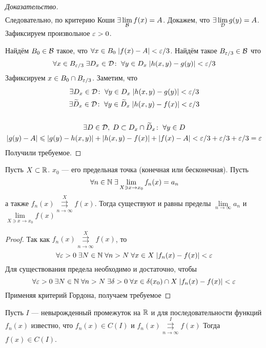 \documentclass[a4paper, 12pt]{article}
\begin{document}
\begin{proof}[Доказательство]
\begin{gather}
    \end{gather}
    Следовательно, по критерию Коши $\exists \lim\limits_{\mathcal{B}} f(x) = A$. Докажем, что $\exists \lim \limits_{\mathcal{D}} g(y) = A$. Зафиксируем произвольное $\varepsilon > 0$.
    \par Найдём  $B_0 \in \mathcal{B}$ такое, что $\forall x\in B_0\; |f(x) - A| < \varepsilon/3$. Найдём такое $B_{\varepsilon/3} \in \mathcal{B}$ что 
    $$
        \forall x\in B_{\varepsilon/3}\; \exists D_x\in \mathcal{D}\colon \; \forall y\in D_x\; |h(x,y) - g(y)| < \varepsilon/3 
    $$
    Зафиксируем $x\in B_0\cap B_{\varepsilon/3}$. Заметим, что 
    \begin{gather}
        \exists D_x \in \mathcal{D}\colon \; \forall y\in D_x \; |h(x,y) - g(y)| <\varepsilon/3\\
        \exists \widetilde{D}_x\in \mathcal{D}\colon \; \forall y\in \widetilde{D}_x\; |h(x,y) - f(x)| < \varepsilon/3\\
        \ \\
        \exists D\in \mathcal{D},\; D \subset D_x \cap \widetilde{D}_x\colon \; \forall y\in D\\
        |g(y) - A| \leqslant |g(y) - h(x,y)| + |h(x,y) - f(x)| + |f(x) - A| < \varepsilon/3 + \varepsilon/3 + \varepsilon/3 = \varepsilon
    \end{gather}
    Получили требуемое.
\end{proof}
\begin{Theorem}
    Пусть $X\subset \mathbb{R}$. $x_0$ --- его предельная точка (конечная или бесконечная). Пусть 
    $$
        \forall n \in \mathbb{N}\; \exists \lim\limits_{X\owns x \to x_0} f_n(x) = a_n
    $$
    а также $f_n(x)\overset{X}{\underset{n\to\infty}{\rightrightarrows}} f(x)$. Тогда  существуют и равны пределы $\lim\limits_{n \to \infty}a_n$ и $\lim\limits_{X \owns x\to x_0} f(x)$
\end{Theorem}
\begin{proof}
    Так как $f_n(x)\overset{X}{\underset{n\to\infty}{\rightrightarrows}} f(x)$, то
    $$
        \forall \varepsilon >0\; \exists N\in \mathbb{N}\; \forall n>N\; \forall x \in X\; |f_n(x) - f(x)| < \varepsilon
    $$
    Для существования предела необходимо и достаточно, чтобы
    $$
        \forall \varepsilon > 0\; \exists N \in \mathbb{N}\; \forall n>N\; \exists \delta >0\; \forall x\in \delta(x_0)\cap X\; |f_n(x) - f(x)| < \varepsilon
    $$
    Применяя критерий Гордона, получаем требуемое
\end{proof}
\begin{Consequence}
    Пусть $I$ --- невырожденный промежуток на $\mathbb{R}$ и для последовательности функций $f_n(x)$ известно, что $f_n(x) \in C(I)$ и $f_n(x)\overset{I}{\underset{n\to\infty}{\rightrightarrows}} f(x)$
    Тогда $f(x) \in C(I)$.
\end{Consequence}
\end{document}
